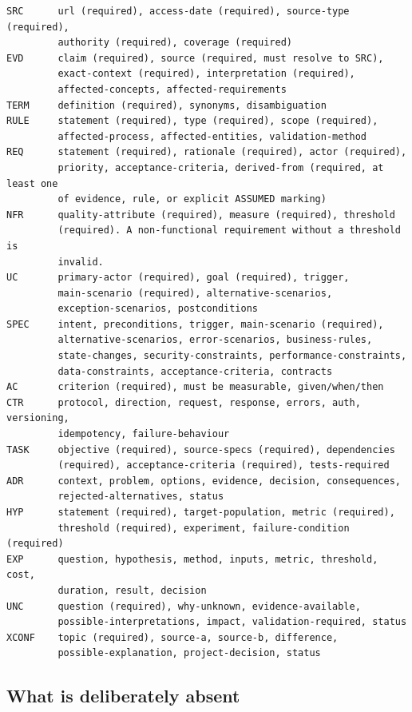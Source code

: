 \documentclass[11pt,a4paper]{article}
\begin{document}
\begin{Verbatim}[fontsize=\footnotesize,breaklines=true,breakanywhere=true,breakautoindent=false,samepage=false]
SRC      url (required), access-date (required), source-type (required),
         authority (required), coverage (required)
EVD      claim (required), source (required, must resolve to SRC),
         exact-context (required), interpretation (required),
         affected-concepts, affected-requirements
TERM     definition (required), synonyms, disambiguation
RULE     statement (required), type (required), scope (required),
         affected-process, affected-entities, validation-method
REQ      statement (required), rationale (required), actor (required),
         priority, acceptance-criteria, derived-from (required, at least one
         of evidence, rule, or explicit ASSUMED marking)
NFR      quality-attribute (required), measure (required), threshold
         (required). A non-functional requirement without a threshold is
         invalid.
UC       primary-actor (required), goal (required), trigger,
         main-scenario (required), alternative-scenarios,
         exception-scenarios, postconditions
SPEC     intent, preconditions, trigger, main-scenario (required),
         alternative-scenarios, error-scenarios, business-rules,
         state-changes, security-constraints, performance-constraints,
         data-constraints, acceptance-criteria, contracts
AC       criterion (required), must be measurable, given/when/then
CTR      protocol, direction, request, response, errors, auth, versioning,
         idempotency, failure-behaviour
TASK     objective (required), source-specs (required), dependencies
         (required), acceptance-criteria (required), tests-required
ADR      context, problem, options, evidence, decision, consequences,
         rejected-alternatives, status
HYP      statement (required), target-population, metric (required),
         threshold (required), experiment, failure-condition (required)
EXP      question, hypothesis, method, inputs, metric, threshold, cost,
         duration, result, decision
UNC      question (required), why-unknown, evidence-available,
         possible-interpretations, impact, validation-required, status
XCONF    topic (required), source-a, source-b, difference,
         possible-explanation, project-decision, status
\end{Verbatim}

\subsection{What is deliberately absent}
\end{document}
